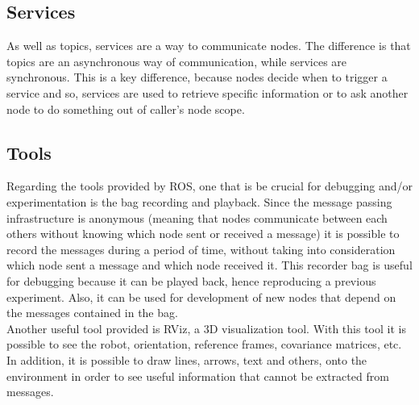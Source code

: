 \subsection{Services}
\label{chapter1:ros:services}
As well as topics, services are a way to communicate nodes. The difference is that topics are an asynchronous way of communication, while services are synchronous. This is a key difference, because nodes decide when to trigger a service and so, services are used to retrieve specific information or to ask another node to do something out of caller's node scope.


\subsection{Tools}
\label{chapter1:ros:tools}
Regarding the tools provided by ROS, one that is be crucial for debugging and/or experimentation is the bag recording and playback. Since the message passing infrastructure is anonymous (meaning that nodes communicate between each others without knowing which node sent or received a message) it is possible to record the messages during a period of time, without taking into consideration which node sent a message and which node received it. This recorder bag is useful for debugging because it can be played back, hence reproducing a previous experiment. Also, it can be used for development of new nodes that depend on the messages contained in the bag.\\

Another useful tool provided is \ac{RViz}, a 3D visualization tool. With this tool it is possible to see the robot, orientation, reference frames, covariance matrices, etc. In addition, it is possible to draw lines, arrows, text and others, onto the environment in order to see useful information that cannot be extracted from messages.

